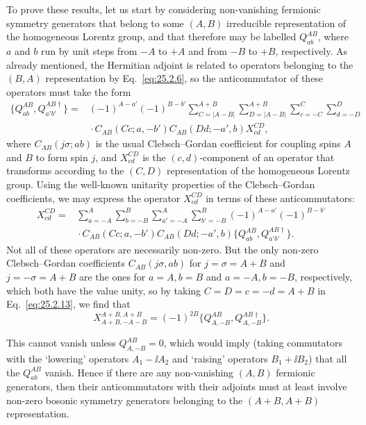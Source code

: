 To prove these results, let us start by considering non-vanishing fermionic
symmetry generators that belong to some \((A,B)\) irreducible representation
of the homogeneous Lorentz group, and that therefore may be labelled
\(Q_{ab}^{AB}\), where \(a\) and \(b\) run by unit steps from \(-A\) to
\(+A\) and from \(-B\) to \(+B\), respectively. As already mentioned, the
Hermitian adjoint is related to operators belonging to the \((B,A)\)
representation by Eq.~\eqref{eq:25.2.6}, so the anticommutator of these
operators must take the form
\begin{equation}
\begin{aligned}
\{Q_{ab}^{AB},Q_{a'b'}^{AB\dagger}\}
={}&(-1)^{A-a'}(-1)^{B-b'}
\sum_{C=|A-B|}^{A+B}
\sum_{D=|A-B|}^{A+B}
\sum_{c=-C}^{C}
\sum_{d=-D}^{D}
\\
&{}\cdot C_{AB}(Cc;a,-b')C_{AB}(Dd;-a',b)X_{cd}^{CD},
\end{aligned}
\tag{25.2.12}\label{eq:25.2.12}
\end{equation}
where \(C_{AB}(j\sigma;ab)\) is the usual Clebsch--Gordan coefficient for
coupling spins \(A\) and \(B\) to form spin \(j\), and \(X_{cd}^{CD}\) is
the \((c,d)\)-component of an operator that transforms according to the
\((C,D)\) representation of the homogeneous Lorentz group. Using the
well-known unitarity properties of the Clebsch--Gordan coefficients, we may
express the operator \(X_{cd}^{CD}\) in terms of these anticommutators:
\begin{equation}
\begin{aligned}
X_{cd}^{CD}
={}&
\sum_{a=-A}^{A}
\sum_{b=-B}^{B}
\sum_{a'=-A}^{A}
\sum_{b'=-B}^{B}
(-1)^{A-a'}(-1)^{B-b'}
\\
&{}\cdot C_{AB}(Cc;a,-b')C_{AB}(Dd;-a',b)
\{Q_{ab}^{AB},Q_{a'b'}^{AB\dagger}\}.
\end{aligned}
\tag{25.2.13}\label{eq:25.2.13}
\end{equation}
Not all of these operators are necessarily non-zero. But the only non-zero
Clebsch--Gordan coefficients \(C_{AB}(j\sigma,ab)\) for
\(j=\sigma=A+B\) and \(j=-\sigma=A+B\) are the ones for
\(a=A,b=B\) and \(a=-A,b=-B\), respectively, which both have the value
unity, so by taking \(C=D=c=-d=A+B\) in Eq.~\eqref{eq:25.2.13}, we find
that
\begin{equation}
X_{A+B,-A-B}^{A+B,A+B}
=(-1)^{2B}\{Q_{A,-B}^{AB},Q_{A,-B}^{AB\dagger}\}.
\tag{25.2.14}\label{eq:25.2.14}
\end{equation}

This cannot vanish unless \(Q_{A,-B}^{AB}=0\), which would imply (taking
commutators with the `lowering' operators \(A_1-\ii A_2\) and `raising'
operators \(B_1+\ii B_2\)) that all the \(Q_{ab}^{AB}\) vanish. Hence if
there are any non-vanishing \((A,B)\) fermionic generators, then their
anticommutators with their adjoints must at least involve non-zero bosonic
symmetry generators belonging to the \((A+B,A+B)\) representation.

